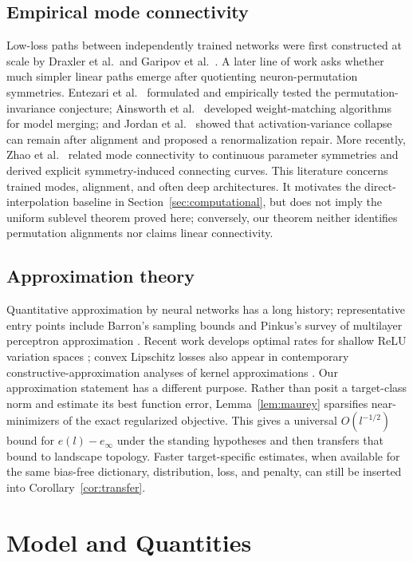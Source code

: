 \documentclass[pdflatex,sn-mathphys-num]{sn-jnl}
\theoremstyle{thmstyleone}
\theoremstyle{thmstyletwo}
\theoremstyle{thmstylethree}
\begin{document}
\subsection{Empirical mode connectivity}
Low-loss paths between independently trained networks were first constructed at scale by Draxler et al.\ and Garipov et al.\ \cite{Draxler2018,Garipov2018}. A later line of work asks whether much simpler linear paths emerge after quotienting neuron-permutation symmetries. Entezari et al.\ \cite{Entezari2022} formulated and empirically tested the permutation-invariance conjecture; Ainsworth et al.\ \cite{Ainsworth2023} developed weight-matching algorithms for model merging; and Jordan et al.\ \cite{Jordan2023} showed that activation-variance collapse can remain after alignment and proposed a renormalization repair. More recently, Zhao et al.\ \cite{Zhao2025} related mode connectivity to continuous parameter symmetries and derived explicit symmetry-induced connecting curves. This literature concerns trained modes, alignment, and often deep architectures. It motivates the direct-interpolation baseline in Section~\ref{sec:computational}, but does not imply the uniform sublevel theorem proved here; conversely, our theorem neither identifies permutation alignments nor claims linear connectivity.

\subsection{Approximation theory}
Quantitative approximation by neural networks has a long history; representative entry points include Barron's sampling bounds \cite{Barron1993} and Pinkus's survey of multilayer perceptron approximation \cite{Pinkus1999}. Recent work develops optimal rates for shallow ReLU variation spaces \cite{YangZhou2025,Siegel2025}; convex Lipschitz losses also appear in contemporary constructive-approximation analyses of kernel approximations \cite{Lian2026}. Our approximation statement has a different purpose. Rather than posit a target-class norm and estimate its best function error, Lemma~\ref{lem:maurey} sparsifies near-minimizers of the exact regularized objective. This gives a universal $O(l^{-1/2})$ bound for $e(l)-e_\infty$ under the standing hypotheses and then transfers that bound to landscape topology. Faster target-specific estimates, when available for the same bias-free dictionary, distribution, loss, and penalty, can still be inserted into Corollary~\ref{cor:transfer}.

\section{Model and Quantities}\label{sec:setting}
\end{document}
